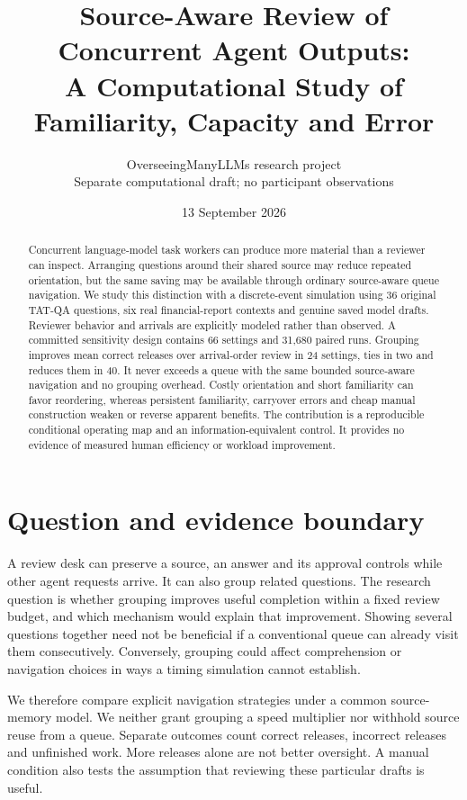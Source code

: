\documentclass[10pt,a4paper]{article}
\title{Source-Aware Review of Concurrent Agent Outputs:\\A Computational Study of Familiarity, Capacity and Error}
\author{OverseeingManyLLMs research project\\\small Separate computational draft; no participant observations}
\date{13 September 2026}
\begin{document}
\maketitle
\begin{abstract}
Concurrent language-model task workers can produce more material than a reviewer
can inspect. Arranging questions around their shared source may reduce repeated
orientation, but the same saving may be available through ordinary source-aware
queue navigation. We study this distinction with a discrete-event simulation
using 36 original TAT-QA questions, six real financial-report contexts and genuine
saved model drafts. Reviewer behavior and arrivals are explicitly modeled rather
than observed. A committed sensitivity design contains 66 settings and 31,680
paired runs. Grouping improves mean correct releases over arrival-order review in
24 settings, ties in two and reduces them in 40. It never exceeds a queue with the
same bounded source-aware navigation and no grouping overhead. Costly orientation
and short familiarity can favor reordering, whereas persistent familiarity,
carryover errors and cheap manual construction weaken or reverse apparent
benefits. The contribution is a reproducible conditional operating map and an
information-equivalent control. It provides no evidence of measured human
efficiency or workload improvement.
\end{abstract}

\section{Question and evidence boundary}
A review desk can preserve a source, an answer and its approval controls while
other agent requests arrive. It can also group related questions. The research
question is whether grouping improves useful completion within a fixed review
budget, and which mechanism would explain that improvement. Showing several
questions together need not be beneficial if a conventional queue can already
visit them consecutively. Conversely, grouping could affect comprehension or
navigation choices in ways a timing simulation cannot establish.

We therefore compare explicit navigation strategies under a common source-memory
model. We neither grant grouping a speed multiplier nor withhold source reuse
from a queue. Separate outcomes count correct releases, incorrect releases and
unfinished work. More releases alone are not better oversight. A manual condition
also tests the assumption that reviewing these particular drafts is useful.
\end{document}
